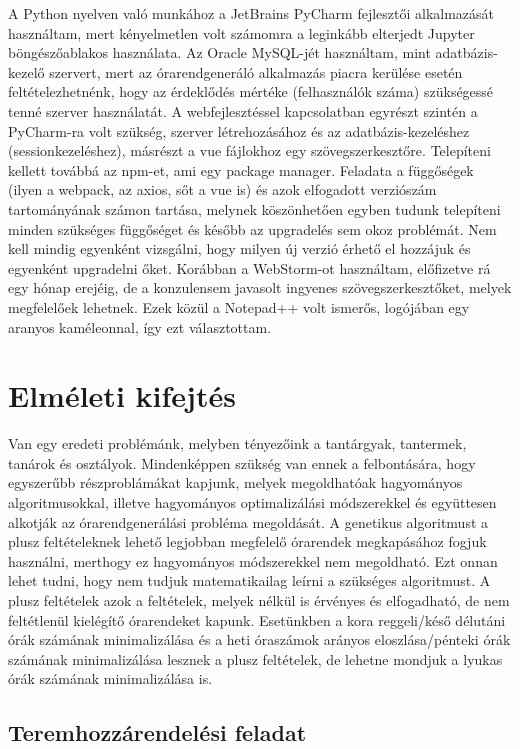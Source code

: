 \documentclass[a4paper,12pt]{article}
\begin{document}
A Python nyelven való munkához a JetBrains PyCharm fejlesztői alkalmazását használtam, mert kényelmetlen volt számomra a leginkább elterjedt Jupyter böngészőablakos használata. Az Oracle MySQL-jét használtam, mint adatbázis-kezelő szervert, mert az órarendgeneráló alkalmazás piacra kerülése esetén feltételezhetnénk, hogy az érdeklődés mértéke (felhasználók száma) szükségessé tenné szerver használatát. A webfejlesztéssel kapcsolatban egyrészt szintén a PyCharm-ra volt szükség, szerver létrehozásához és az adatbázis-kezeléshez (sessionkezeléshez), másrészt a vue fájlokhoz egy szövegszerkesztőre. Telepíteni kellett továbbá az npm-et, ami egy package manager. Feladata a függőségek (ilyen a webpack, az axios, sőt a vue is) és azok elfogadott verziószám tartományának számon tartása, melynek köszönhetően egyben tudunk telepíteni minden szükséges függőséget és később az upgradelés sem okoz problémát. Nem kell mindig egyenként vizsgálni, hogy milyen új verzió érhető el hozzájuk és egyenként upgradelni őket. Korábban a WebStorm-ot használtam, előfizetve rá egy hónap erejéig, de a konzulensem javasolt ingyenes szövegszerkesztőket, melyek megfelelőek lehetnek. Ezek közül a Notepad++ volt ismerős, logójában egy aranyos kaméleonnal, így ezt választottam.

\section{Elméleti kifejtés}

Van egy eredeti problémánk, melyben tényezőink a tantárgyak, tantermek, tanárok és 
osztályok. Mindenképpen szükség van ennek a felbontására, hogy egyszerűbb részproblámákat kapjunk, melyek megoldhatóak hagyományos algoritmusokkal, illetve hagyományos optimalizálási módszerekkel és együttesen alkotják az órarendgenerálási probléma megoldását. A genetikus algoritmust a plusz feltételeknek lehető legjobban megfelelő órarendek megkapásához fogjuk használni, merthogy ez hagyományos módszerekkel nem megoldható. Ezt onnan lehet tudni, hogy nem tudjuk matematikailag leírni a szükséges algoritmust. A plusz feltételek azok a feltételek, melyek nélkül is érvényes és elfogadható, de nem feltétlenül kielégítő órarendeket kapunk. Esetünkben a kora reggeli/késő délutáni órák számának minimalizálása és a heti óraszámok arányos eloszlása/pénteki órák számának minimalizálása lesznek a plusz feltételek, de lehetne mondjuk a lyukas órák számának minimalizálása is.

\subsection{Teremhozzárendelési feladat}
\end{document}
